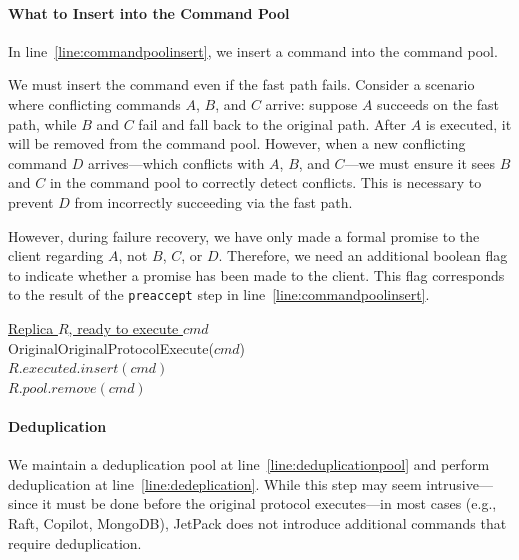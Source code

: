 \documentclass[twocolumn]{article}
\begin{document}
\paragraph{What to Insert into the Command Pool} 
In line~\ref{line:commandpoolinsert}, we insert a command into the command pool.

We must insert the command even if the fast path fails. Consider a scenario where conflicting commands $A$, $B$, and $C$ arrive: suppose $A$ succeeds on the fast path, while $B$ and $C$ fail and fall back to the original path. After $A$ is executed, it will be removed from the command pool. However, when a new conflicting command $D$ arrives—which conflicts with $A$, $B$, and $C$—we must ensure it sees $B$ and $C$ in the command pool to correctly detect conflicts. This is necessary to prevent $D$ from incorrectly succeeding via the fast path.

However, during failure recovery, we have only made a formal promise to the client regarding $A$, not $B$, $C$, or $D$. Therefore, we need an additional boolean flag to indicate whether a promise has been made to the client. This flag corresponds to the result of the \texttt{preaccept} step in line~\ref{line:commandpoolinsert}.



\begin{algorithm}
\caption{Original Protocol - Execute}
    \label{alg:original_execute}
    \setcounter{AlgoLine}{36}
    \underline{Replica $R$, ready to execute $cmd$}\\
     {
        OriginalOriginalProtocolExecute($cmd$)\\
        $R.executed.insert(cmd)$\label{line:deduplicationpool}\\
    }
    $R.pool.remove(cmd)$\label{line:normalgc}\\
\end{algorithm}

\paragraph{Deduplication} 
We maintain a deduplication pool at line~\ref{line:deduplicationpool} and perform deduplication at line~\ref{line:dedeplication}. While this step may seem intrusive—since it must be done before the original protocol executes—in most cases (e.g., Raft, Copilot, MongoDB), JetPack does not introduce additional commands that require deduplication.
\end{document}
